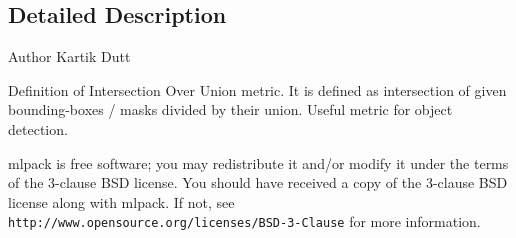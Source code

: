 \subsection{Detailed Description}
\begin{DoxyAuthor}{Author}
Kartik Dutt
\end{DoxyAuthor}
Definition of Intersection Over Union metric. It is defined as intersection of given bounding-\/boxes / masks divided by their union. Useful metric for object detection.

mlpack is free software; you may redistribute it and/or modify it under the terms of the 3-\/clause B\+SD license. You should have received a copy of the 3-\/clause B\+SD license along with mlpack. If not, see {\tt http\+://www.\+opensource.\+org/licenses/\+B\+S\+D-\/3-\/\+Clause} for more information. 